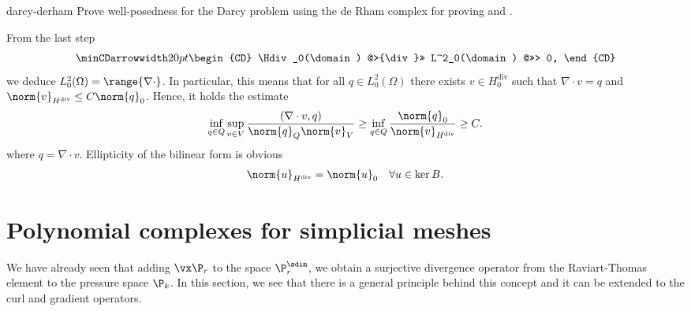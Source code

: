 \begin{Problem}{darcy-derham}
  Prove well-posedness for the Darcy problem using the de Rham complex
  for proving  and
  .
\begin{solution}
From the last step
 \begin{gather}\minCDarrowwidth20pt
    \begin{CD}
      \Hdiv_0(\domain)
      @>{\div}>> L^2_0(\domain)
      @>>> 0,
    \end{CD}
  \end{gather}
we deduce $L_0^2(\Omega)=\range{\nabla\cdot}$. In particular, this means
that for all $q\in L_0^2(\Omega)$ there exists $v\in H_0^{\text{div}}$ such that
$\nabla \cdot v=q$ and $\norm{v}_{H^{\text{div}}}\leq C \norm{q}_0$.
Hence, it holds the estimate
\begin{align}
\inf_{q\in Q}\sup_{v\in V}\frac{(\nabla \cdot v, q)}{\norm{q}_Q\norm{v}_V}
  \geq \inf_{q\in Q} \frac{\norm{q}_0}{\norm{v}_{H^{\text{div}}}}\geq C.
\end{align}
where $q = \nabla \cdot v$. Ellipticity of the bilinear form is obvious
\begin{align}
  \norm{u}_{H^{\text{div}}}=\norm{u}_0 \quad \forall u\in \ker B.
\end{align}
\end{solution}
\end{Problem}

\section{Polynomial complexes for simplicial meshes}

\begin{intro}
  We have already seen that adding $\vx\P_r$ to the space $\P_r^\sdim$, we
  obtain a surjective divergence operator from the Raviart-Thomas
  element to the pressure space $\P_k$. In this section, we see that
  there is a general principle behind this concept and it can be
  extended to the curl and gradient operators.
\end{intro}

